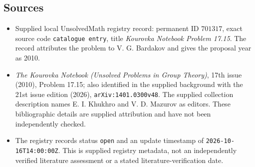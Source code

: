 \documentclass[11pt]{article}
\begin{document}
\subsection{Sources}
\begin{itemize}
\item Supplied local UnsolvedMath registry record: permanent ID \(701317\), exact source code \texttt{catalogue entry}, title \emph{Kourovka Notebook Problem 17.15}. The record attributes the problem to V. G. Bardakov and gives the proposal year as 2010.
\item \emph{The Kourovka Notebook (Unsolved Problems in Group Theory)}, 17th issue (2010), Problem 17.15; also identified in the supplied background with the 21st issue edition (2026), \texttt{arXiv:1401.0300v48}. The supplied collection description names E. I. Khukhro and V. D. Mazurov as editors. These bibliographic details are supplied attribution and have not been independently checked.
\item The registry records status \texttt{open} and an update timestamp of \texttt{2026-10-16T14:00:00Z}. This is supplied registry metadata, not an independently verified literature assessment or a stated literature-verification date.
\end{itemize}
\end{document}
